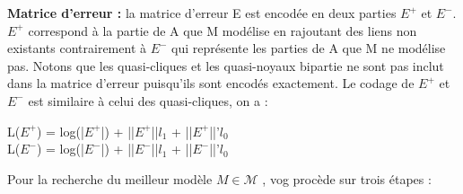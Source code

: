 \textbf{Matrice d'erreur :} la matrice d'erreur E est encodée en deux parties $E^{+}$ et $E^{-}$. $E^{+}$  correspond à la partie de A que M modélise en rajoutant des liens non existants contrairement à $E^{-}$ qui représente les parties de A que M ne modélise pas. Notons que les quasi-cliques et les quasi-noyaux bipartie ne sont pas inclut dans la matrice d'erreur puisqu'ils sont encodés exactement. Le codage de $E^{+}$ et $E^{-}$ est similaire à celui des quasi-cliques, on a :
\begin{center}
L(${E}^{+}$) = log(|${E}^{+}$|) + ||${E}^{+}$||\textit{$l_{1}$} + ||${E}^{+}$||'\textit{$l_{0}$}\\
L(${E}^{-}$) = log(|${E}^{-}$|) + ||${E}^{-}$||\textit{$l_{1}$} + ||${E}^{-}$||'\textit{$l_{0}$}\\
\end{center} 
Pour la recherche du meilleur modèle $ \textit{M} \in \mathcal{M} $ , \gls{vog} procède sur trois étapes :
